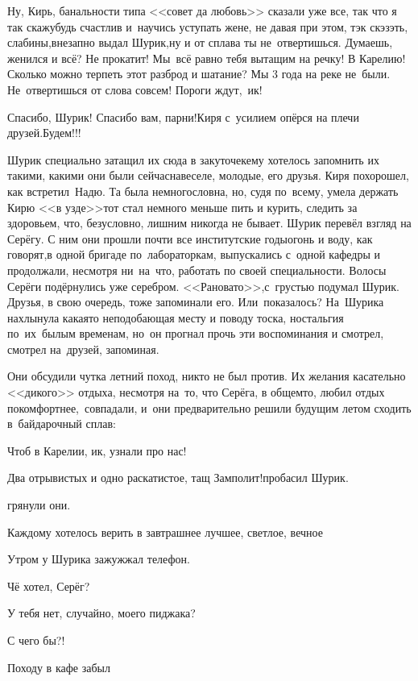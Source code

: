 {\diagdash Ну, Кирь, банальности типа <<совет да любовь>> сказали уже все, так что я так скажу\mdash будь счастлив и~научись уступать жене, не давая при этом, тэк скэзэть, слабины,\mdash внезапно выдал Шурик,\mdash ну и от сплава ты не~отвертишься. Думаешь, женился и всё? Не прокатит! Мы~всё равно тебя вытащим на речку! В Карелию! Сколько можно терпеть этот разброд и шатание? Мы 3 года на реке не~были. Не~отвертишься от слова совсем! Пороги ждут,~ик!

\diagdash Спасибо, Шурик! Спасибо вам, парни!\mdash Киря с~усилием опёрся на плечи друзей.\mdash Будем!!!%

Шурик специально затащил их сюда в закуточек\mdash ему хотелось запомнить их такими, какими они были сейчас\mdash навеселе, молодые, его друзья. Киря похорошел, как встретил~Надю. Та была немногословна, но, судя по~всему, умела держать Кирю <<в узде>>\mdash тот стал немного меньше пить и курить, следить за здоровьем, что, безусловно, лишним никогда не бывает. Шурик перевёл взгляд на Серёгу. С ним они прошли почти все институтские годы\mdash огонь и воду, как говорят,\mdash в одной бригаде по~лабораторкам, выпускались с~одной кафедры и продолжали, несмотря ни~на~что, работать по своей специальности. Волосы Серёги подёрнулись уже серебром. <<Рановато>>,\mdash с~грустью подумал Шурик. Друзья, в свою очередь, тоже запоминали его. Или~показалось? На~Шурика нахлынула какая\sdash то неподобающая месту и поводу тоска, ностальгия по~их~былым временам, но~он прогнал прочь эти воспоминания и смотрел, смотрел на~друзей, запоминая.  

Они обсудили чутка летний поход, никто не был против. Их желания касательно <<дикого>> отдыха, несмотря на~то, что Серёга, в общем\sdash то, любил отдых покомфортнее,~совпадали, и~они предварительно решили будущим летом сходить в~байдарочный сплав:

\diagdash Чтоб в Карелии, ик, узнали про нас!%

\diagdash Два отрывистых и одно раскатистое, тащ Замполит!\mdash пробасил Шурик.

\mdash грянули они. 

Каждому хотелось верить в завтрашнее лучшее, светлое, вечное\myldots{}

\vspace{2.0cm}
\myldots{}Утром у Шурика зажужжал телефон. 

\diagdash Чё хотел, Серёг?

\diagdash У тебя нет, случайно, моего пиджака?

\diagdash С чего бы?!

\diagdash Походу в кафе забыл\myldots{}

\begin{center}
\end{center}
}
